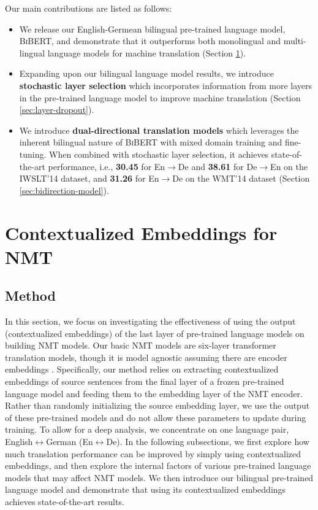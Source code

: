 \documentclass[11pt]{article}
\begin{document}
Our main contributions are listed as follows:
\begin{itemize}
  \itemsep0em 
  \item We release our English-Germean bilingual pre-trained language model, \textsc{BiBERT}, and demonstrate that it outperforms both monolingual and multi-lingual language models for machine translation (Section \ref{sec:contextualized_embedding}).
  \item Expanding upon our bilingual language model results, we introduce \textbf{stochastic layer selection} which incorporates information from more layers in the pre-trained language model to improve machine translation (Section \ref{sec:layer-dropout}).
  \item We introduce \textbf{dual-directional translation models} which leverages the inherent bilingual nature of \textsc{BiBERT} with mixed domain training and fine-tuning. When combined with stochastic layer selection, it achieves state-of-the-art performance, i.e., \textbf{30.45} for En$\rightarrow$De and \textbf{38.61} for De$\rightarrow$En on the IWSLT'14 dataset, and \textbf{31.26} for En$\rightarrow$De on the WMT'14 dataset
  (Section \ref{sec:bidirection-model}).
\end{itemize}

\section{Contextualized Embeddings for NMT }
\label{sec:contextualized_embedding}
\subsection{Method}
In this section, we focus on investigating the effectiveness of using the output (contextualized embeddings) of the last layer of pre-trained language models on building NMT models. Our basic NMT models are six-layer transformer translation models, though it is model agnostic assuming there are encoder embeddings \citep{NIPS2017_3f5ee243}. Specifically, our method relies on extracting contextualized embeddings of source sentences from the final layer of a frozen pre-trained language model and feeding them to the embedding layer of the NMT encoder. Rather than randomly initializing the source embedding layer, we use the output of these pre-trained models and do not allow these parameters to update during training. To allow for a deep analysis, we concentrate on one language pair, English$\leftrightarrow$German (En$\leftrightarrow$De). In the following subsections, we first explore how much translation performance can be improved by simply using contextualized embeddings, and then explore the internal factors of various pre-trained language models that may affect NMT models. We then  introduce our bilingual pre-trained language model and demonstrate that using its contextualized embeddings achieves state-of-the-art results.
\end{document}
